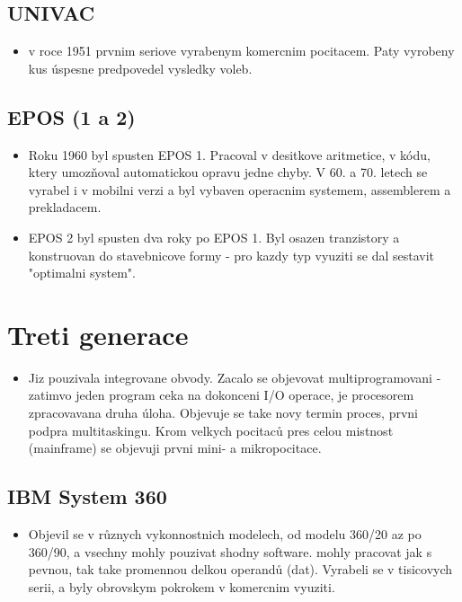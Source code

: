\documentclass[a4paper,12pt]{article}
\begin{document}
    \subsection{UNIVAC}
        \begin{itemize}
            \item{v roce 1951 prvnim seriove vyrabenym komercnim pocitacem. Paty vyrobeny kus úspesne predpovedel vysledky voleb.}
        \end{itemize}
    \subsection{EPOS (1 a 2)}
        \begin{itemize}
            \item{Roku 1960 byl spusten EPOS 1. Pracoval v desitkove aritmetice, v kódu, ktery umozňoval automatickou opravu jedne chyby. V 60. a 70. letech se vyrabel i v mobilni verzi a byl vybaven operacnim systemem, assemblerem a prekladacem.}
            \item{EPOS 2 byl spusten dva roky po EPOS 1. Byl osazen tranzistory a konstruovan do stavebnicove formy - pro kazdy typ vyuziti se dal sestavit "optimalni system".}
        \end{itemize}

\section{Treti generace}
    \begin{itemize}
        \item{Jiz pouzivala integrovane obvody. Zacalo se objevovat multiprogramovani - zatimvo jeden program ceka na dokonceni I/O operace, je procesorem zpracovavana druha úloha. Objevuje se take novy termin proces, prvni podpra multitaskingu. Krom velkych pocitaců pres celou mistnost (mainframe) se objevuji prvni mini- a mikropocitace.}
    \end{itemize}
    \subsection{IBM System 360}
        \begin{itemize}
            \item{Objevil se v různych vykonnostnich modelech, od modelu 360/20 az po 360/90, a vsechny mohly pouzivat shodny software. mohly pracovat jak s pevnou, tak take promennou delkou operandů (dat). Vyrabeli se v tisicovych serii, a byly obrovskym pokrokem v komercnim vyuziti.}
        \end{itemize}
\end{document}
